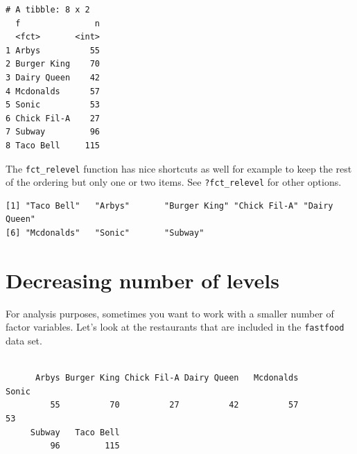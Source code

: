 \documentclass[
  letterpaper,
  DIV=11,
  numbers=noendperiod,
  oneside]{scrreprt}
\newenvironment{Shaded}{\begin{snugshade}}{\end{snugshade}}
\newcommand{\AttributeTok}[1]{\textcolor[rgb]{0.40,0.45,0.13}{#1}}
\newcommand{\CommentTok}[1]{\textcolor[rgb]{0.37,0.37,0.37}{#1}}
\newcommand{\ConstantTok}[1]{\textcolor[rgb]{0.56,0.35,0.01}{#1}}
\newcommand{\FunctionTok}[1]{\textcolor[rgb]{0.28,0.35,0.67}{#1}}
\newcommand{\NormalTok}[1]{\textcolor[rgb]{0.00,0.23,0.31}{#1}}
\newcommand{\SpecialCharTok}[1]{\textcolor[rgb]{0.37,0.37,0.37}{#1}}
\newcommand{\StringTok}[1]{\textcolor[rgb]{0.13,0.47,0.30}{#1}}
\begin{document}
\begin{verbatim}
# A tibble: 8 x 2
  f               n
  <fct>       <int>
1 Arbys          55
2 Burger King    70
3 Dairy Queen    42
4 Mcdonalds      57
5 Sonic          53
6 Chick Fil-A    27
7 Subway         96
8 Taco Bell     115
\end{verbatim}

The \texttt{fct\_relevel} function has nice shortcuts as well for
example to keep the rest of the ordering but only one or two items. See
\texttt{?fct\_relevel} for other options.

\begin{Shaded}
\end{Shaded}

\begin{verbatim}
[1] "Taco Bell"   "Arbys"       "Burger King" "Chick Fil-A" "Dairy Queen"
[6] "Mcdonalds"   "Sonic"       "Subway"     
\end{verbatim}

\section{Decreasing number of levels}\label{decreasing-number-of-levels}

For analysis purposes, sometimes you want to work with a smaller number
of factor variables. Let's look at the restaurants that are included in
the \texttt{fastfood} data set.

\begin{Shaded}
\end{Shaded}

\begin{verbatim}

      Arbys Burger King Chick Fil-A Dairy Queen   Mcdonalds       Sonic 
         55          70          27          42          57          53 
     Subway   Taco Bell 
         96         115 
\end{verbatim}
\end{document}
